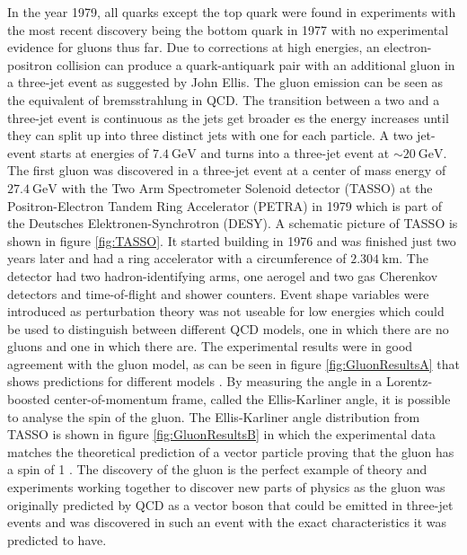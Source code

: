 In the year 1979, all quarks except the top quark were found in experiments with the most recent discovery being the bottom quark in 1977 with no experimental evidence for gluons thus far.
Due to corrections at high energies, an electron-positron collision can produce a quark-antiquark pair with an additional gluon in a three-jet event as suggested by John Ellis.
The gluon emission can be seen as the equivalent of bremsstrahlung in QCD.
The transition between a two and a three-jet event is continuous as the jets get broader es the energy increases until they can split up into three distinct jets with one for each particle.
A two jet-event starts at energies of $\SI{7.4}{\giga\eV}$ and turns into a three-jet event at $\sim\SI{20}{\giga\eV}$.
The first gluon was discovered in a three-jet event at a center of mass energy of $\SI{27.4}{\giga\eV}$ with the Two Arm Spectrometer Solenoid detector (TASSO) at the Positron-Electron Tandem Ring Accelerator (PETRA) in 1979 which is part of the Deutsches Elektronen-Synchrotron (DESY).
A schematic picture of TASSO is shown in figure \ref{fig:TASSO}.
It started building in 1976 and was finished just two years later and had a ring accelerator with a circumference of $\SI{2.304}{\kilo\meter}$. %
The detector had two hadron-identifying arms, one aerogel and two gas Cherenkov detectors and time-of-flight and shower counters.
Event shape variables were introduced as perturbation theory was not useable for low energies which could be used to distinguish between different QCD models, one in which there are no gluons and one in which there are.
The experimental results were in good agreement with the gluon model, as can be seen in figure \ref{fig:GluonResultsA} that shows predictions for different models \cite{Branson:1994eu}.
By measuring the angle in a Lorentz-boosted center-of-momentum frame, called the Ellis-Karliner angle, it is possible to analyse the spin of the gluon.
The Ellis-Karliner angle distribution from TASSO is shown in figure \ref{fig:GluonResultsB} in which the experimental data matches the theoretical prediction of a vector particle proving that the gluon has a spin of 1 \cite{Venker, Soding:1996zk}.
The discovery of the gluon is the perfect example of theory and experiments working together to discover new parts of physics as the gluon was originally predicted by QCD as a vector boson that could be emitted in three-jet events and was discovered in such an event with the exact characteristics it was predicted to have.

